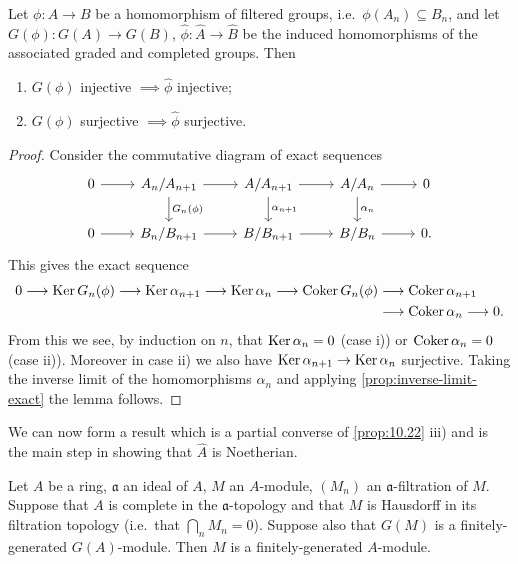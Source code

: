 \begin{lemma}\label{lem:completion-graded-injective-surjective}
    Let $\phi: A \to B$ be a homomorphism of filtered groups, i.e.\ $\phi(A_n) \subseteq B_n$, and let $G(\phi): G(A) \to G(B)$, $\hat{\phi}: \hat{A} \to \hat{B}$ be the induced homomorphisms of the associated graded and completed groups. Then
    \begin{enumerate}
        \item[i)] $G(\phi)$ injective $\implies \hat{\phi}$ injective;
        \item[ii)] $G(\phi)$ surjective $\implies \hat{\phi}$ surjective.
    \end{enumerate}
\end{lemma}

\begin{proof}
Consider the commutative diagram of exact sequences
\[
\begin{tikzcd}
0 \arrow[r] & A_n/A_{n+1} \arrow[r] \arrow[d, "G_n(\phi)"] & A/A_{n+1} \arrow[r] \arrow[d, "\alpha_{n+1}"] & A/A_n \arrow[r] \arrow[d, "\alpha_n"] & 0 \\
0 \arrow[r] & B_n/B_{n+1} \arrow[r] & B/B_{n+1} \arrow[r] & B/B_n \arrow[r] & 0.
\end{tikzcd}
\]
This gives the exact sequence
\begin{align*}
    0\longrightarrow \operatorname{Ker} G_n(\phi) \longrightarrow \operatorname{Ker} \alpha_{n+1} \longrightarrow \operatorname{Ker} \alpha_n \longrightarrow \operatorname{Coker} G_n(\phi) & \longrightarrow \operatorname{Coker} \alpha_{n+1} \\ & \longrightarrow \operatorname{Coker} \alpha_n \longrightarrow 0.
\end{align*}
From this we see, by induction on $n$, that $\operatorname{Ker} \alpha_n = 0$ (case i)) or $\operatorname{Coker} \alpha_n = 0$ (case ii)). Moreover in case ii) we also have $\operatorname{Ker} \alpha_{n+1} \to \operatorname{Ker} \alpha_n$ surjective. Taking the inverse limit of the homomorphisms $\alpha_n$ and applying \eqref{prop:inverse-limit-exact} the lemma follows.
\end{proof}

We can now form a result which is a partial converse of \eqref{prop:10.22} iii) and is the main step in showing that $\hat{A}$ is Noetherian.

\begin{proposition}\label{prop:10.24}
Let $A$ be a ring, $\mathfrak{a}$ an ideal of $A$, $M$ an $A$-module, $(M_n)$ an $\mathfrak{a}$-filtration of $M$. Suppose that $A$ is complete in the $\mathfrak{a}$-topology and that $M$ is Hausdorff in its filtration topology (i.e.\ that $\bigcap_n M_n = 0$). Suppose also that $G(M)$ is a finitely-generated $G(A)$-module. Then $M$ is a finitely-generated $A$-module.
\end{proposition}

